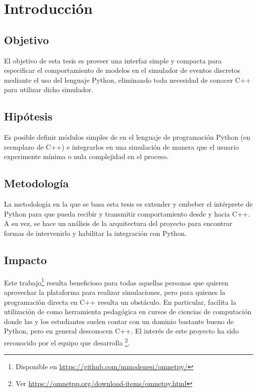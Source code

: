 \chapter{Introducción}
\section{Objetivo}

El objetivo de esta tesis es proveer una interfaz simple y compacta para
especificar el comportamiento de modelos en el simulador de eventos discretos
\omnetpp{} mediante el uso del lenguaje Python, eliminando toda necesidad de
conocer C++ para utilizar dicho simulador.

\section{Hipótesis}

Es posible definir módulos simples de \omnetpp{} en el lenguaje de programación
Python (en reemplazo de C++) e integrarlos en una simulación de manera que el
usuario experimente mínima o nula complejidad en el proceso.

\section{Metodología}

La metodología en la que se basa esta tesis es extender y embeber el intérprete
de Python para que pueda recibir y transmitir comportamiento desde y hacia C++.
A su vez, se hace un análisis de la arquitectura del proyecto \omnetpp{} para
encontrar formas de intervenirlo y habilitar la integración con Python.

\section{Impacto}

Este trabajo\footnote{Disponible en
\url{https://github.com/mmodenesi/omnetpy/}} resulta beneficioso para todas
aquellas personas que quieren aprovechar la plataforma \omnetpp{} para realizar
simulaciones, pero para quienes la programación directa en C++ resulta un
obstáculo. En particular, facilita la utilización de \omnetpp{} como
herramienta pedagógica en cursos de ciencias de computación donde las y los
estudiantes suelen contar con un dominio bastante bueno de Python, pero en
general desconocen C++. El interés de este proyecto ha sido reconocido por el
equipo que desarrolla \omnetpp{}\footnote{Ver
\url{https://omnetpp.org/download-items/omnetpy.html}}.


